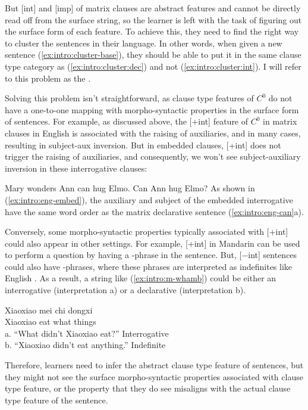 {But [\textpm int] and [imp] of matrix clauses are abstract features and cannot be directly read off from the surface string, so the learner is left with the task of figuring out the surface form of each feature. To achieve this, they need to find the right way to cluster the sentences in their language. In other words, when given a new sentence (\ref{ex:intro:cluster-base}), they should be able to put it in the same clause type category as (\ref{ex:intro:cluster:dec}) and not (\ref{ex:intro:cluster:int}). I will refer to this problem as the . 

Solving this problem isn't straightforward, as clause type features of $C^{0}$ do not have a one-to-one mapping with morpho-syntactic properties in the surface form of sentences. For example, as discussed above, the [+int] feature of $C^{0}$ in matrix clauses in English is associated with the raising of auxiliaries, and in many cases, resulting in subject-aux inversion. But in embedded clauses, [+int] does not trigger the raising of auxiliaries, and consequently, we won't see subject-auxiliary inversion in these interrogative clauses: %

Mary wonders 
\eex
{}
\bxl
Ann can hug Elmo.
\ex Can Ann hug Elmo?
\exl
\eex
As shown in (\ref{ex:intro:eng-embed}), the auxiliary  and subject  of the embedded interrogative have the same word order as the matrix declarative sentence (\ref{ex:intro:eng-can}a).


Conversely, some morpho-syntactic properties typically associated with [+int] could also appear in other settings. For example, [+int] in Mandarin can be used to perform a question by having a \twh-phrase in the sentence. But, [$-$int] sentences could also have \twh-phrases, where these phrases are interpreted as indefinites like English . As a result, a string like (\ref{ex:intro:m-whamb}) could be either an interrogative (interpretation a) or a declarative (interpretation b). 


\gll Xiaoxiao mei 	chi 	 dongxi\\ 
Xiaoxiao \Neg{} 	eat	what	things\\
a.	``What didn’t Xiaoxiao eat?''	\hfill Interrogative \twh\\
b.	``Xiaoxiao didn’t eat anything.''		\hfill Indefinite \twh
\eex

Therefore, learners need to infer the abstract clause type feature of sentences, but they might not see the surface morpho-syntactic properties associated with clause type feature, or the property that they do see misaligns with the actual clause type feature of the sentence.

}
